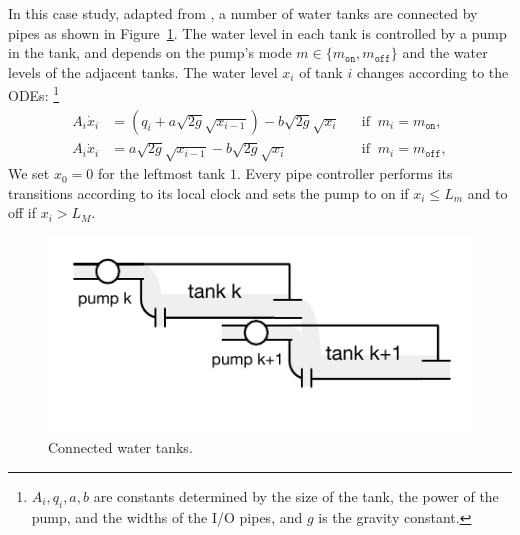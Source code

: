 In this case study, adapted from
\cite{kowalewski1999case,raisch1999approximating}, 
a number of water tanks are connected by pipes as shown in
Figure~\ref{fig:water}. 
The water level in each tank is controlled by a pump in the tank, and 
 depends on the pump's mode $m \in \{m_\texttt{on}, m_\texttt{off}\}$
and the water levels of the adjacent tanks.
The water level $x_i$ of tank $i$ changes according to the ODEs:%
\footnote{%
$A_i, q_i, a, b $ are constants determined by the size of the tank, the power of the pump, 
and the widths of the I/O pipes,
and $g$ is the %
gravity constant.}
\[
\begin{aligned}
A_i \dot{x}_i &=  (q_i + a \sqrt{2g} \sqrt{x_{i-1}})  - b \sqrt{2g} \sqrt{x_i}
&& \mbox{if}\;\; m_i = m_\texttt{on},
\\
A_i \dot{x}_i &= a \sqrt{2g} \sqrt{x_{i-1}}  - b \sqrt{2g} \sqrt{x_i}
&& \mbox{if}\;\; m_i = m_\texttt{off},
\end{aligned}
\]
We set $x_0 = 0$ for the leftmost tank $1$.
%
Every pipe controller performs its transitions according to its local
clock and sets  
the pump to on if $x_i \leq L_m$ and to off if $x_i > L_M$.

\begin{figure}
\centering
\includegraphics[clip=true,trim=0.3cm 0.35cm 0.3cm 0.35cm,width=0.7\columnwidth]{water.pdf}    
\caption{Connected water tanks.}  \label{fig:water}
\end{figure}

